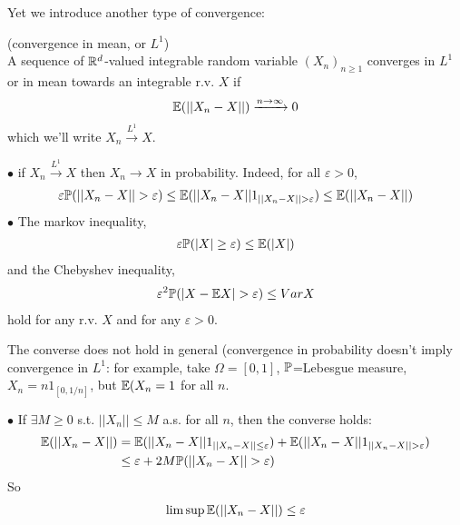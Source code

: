 \documentclass[a4paper]{article}
\begin{document}
Yet we introduce another type of convergence:

\begin{defi} (convergence in mean, or $L^1$)\\
A sequence of $\R^d$-valued integrable random variable $(X_n)_{n \geq 1}$ converges in $L^1$ or in mean towards an integrable r.v. $X$ if
\begin{equation*}
\begin{aligned}
\E(||X_n-X||) \xrightarrow{n \to \infty} 0
\end{aligned}
\end{equation*}
which we'll write $X_n \xrightarrow{L^1} X$.
\end{defi}

\begin{rem}
$\bullet$ if $X_n \xrightarrow{L^1} X$ then $X_n \to X$ in probability. Indeed, for all $\varepsilon>0$,
\begin{equation*}
\begin{aligned}
\varepsilon \P(||X_n-X|| > \varepsilon) \leq \E (||X_n - X|| 1_{||X_n-X||>\varepsilon}) \leq \E(||X_n-X||)
\end{aligned}
\end{equation*}
$\bullet$ The markov inequality,
\begin{equation*}
\begin{aligned}
\varepsilon\P(|X| \geq \varepsilon) \leq \E(|X|)
\end{aligned}
\end{equation*}
and the Chebyshev inequality,
\begin{equation*}
\begin{aligned}
\varepsilon^2 \P(|X-\E X| > \varepsilon) \leq Var X
\end{aligned}
\end{equation*}
hold for any r.v. $X$ and for any $\varepsilon>0$.

The converse does not hold in general (convergence in probability doesn't imply convergence in $L^1$: for example, take $\Omega = [0,1]$, $\P$=Lebesgue measure, $X_n = n 1_{[0,1/n]}$, but $\E (X_n = 1$ for all $n$.

$\bullet$ If $\exists M \geq 0$ s.t. $||X_n || \leq M$ a.s. for all $n$, then the converse holds:
\begin{equation*}
\begin{aligned}
\E(||X_n-X||) &= \E(||X_n-X|| 1_{||X_n-X||\leq \varepsilon}) + \E(||X_n-X|| 1_{||X_n-X||>\varepsilon})\\
&\leq \varepsilon + 2M \P(||X_n-X||>\varepsilon)
\end{aligned}
\end{equation*}
So
\begin{equation*}
\begin{aligned}
\limsup \E(||X_n-X||)\leq \varepsilon
\end{aligned}
\end{equation*}
\end{rem}
\end{document}
